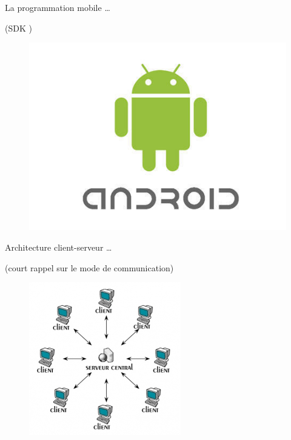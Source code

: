 \begin{frame}
\begin{center}
La programmation mobile \dots

(SDK \android{})
\begin{figure}
\includegraphics[scale=0.2]{images/android.jpg}
\end{figure}
\end{center}
\end{frame}

\begin{frame}
\begin{center}
Architecture client-serveur \dots

(court rappel sur le mode de communication)
\begin{figure}
\includegraphics[scale=0.5]{images/client_serveur.jpg}
\end{figure}
\end{center}
\end{frame}